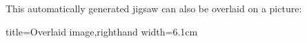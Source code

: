 \documentclass{scrartcl}
\begin{document}
This automatically generated jigsaw can also be overlaid on a picture:

\begin{tcblisting}{title={Overlaid image},righthand width=6.1cm}
\end{tcblisting}
\end{document}
